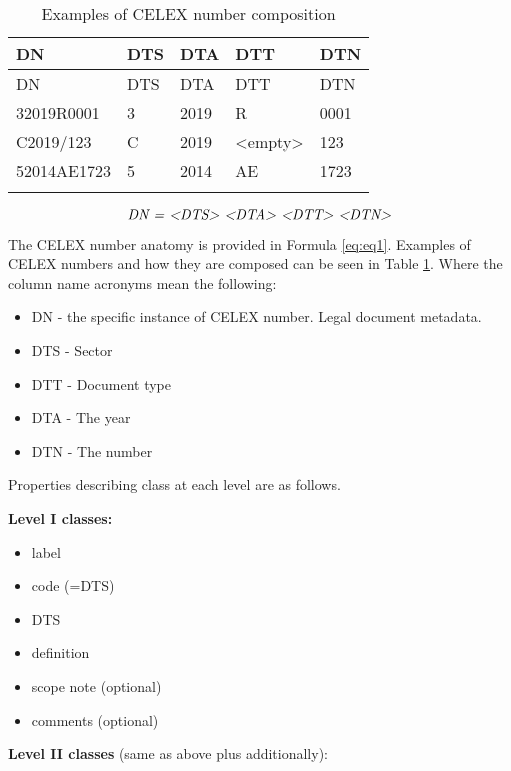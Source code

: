 \begin{longtable}[!ht]{@{}p{3.2cm}p{2cm}p{2cm}p{2cm}p{2cm}@{}}
	\toprule
	DN & DTS & DTA & DTT & DTN\tabularnewline
	\midrule
	\endfirsthead
	\toprule
	DN & DTS & DTA & DTT & DTN\tabularnewline
	\midrule
	\endhead
	32019R0001 & 3 & 2019 & R & 0001\tabularnewline
	C2019/123 & C & 2019 & \textless{}empty\textgreater{} &
	123\tabularnewline
	52014AE1723 & 5 & 2014 & AE & 1723\tabularnewline
	\bottomrule
	\caption{Examples of CELEX number composition}
	\label{tab:ex2}
	\vspace{-10pt}
\end{longtable}

\begin{equation}
	\emph{DN =
		\textless{}DTS\textgreater{} \textless{}DTA\textgreater{}
		\textless{}DTT\textgreater{} \textless{}DTN\textgreater{}}
	\label{eq:eq1}
\end{equation}

The CELEX number anatomy is provided in Formula \ref{eq:eq1}. Examples of
CELEX numbers and how they are composed can be seen in Table \ref{tab:ex2}. Where the
column name acronyms mean the following:

\begin{itemize}

\item
  DN - the specific instance of CELEX number. Legal document metadata.
\item
  DTS - Sector
\item
  DTT - Document type
\item
  DTA - The year
\item
  DTN - The number
\end{itemize}



Properties describing class at each level are as follows.

\textbf{Level I classes:}

\begin{itemize}

\item
  label
\item
  code (=DTS)
\item
  DTS
\item
  definition
\item
  scope note (optional)
\item
  comments (optional)
\end{itemize}

\textbf{Level II classes} (same as above plus additionally):

